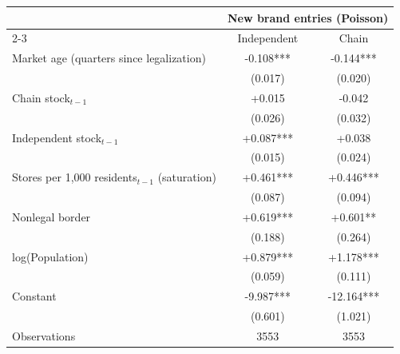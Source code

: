 \begin{tabular}{@{}lcc@{}}
\toprule
 & \multicolumn{2}{c}{New brand entries (Poisson)} \\
\cmidrule(lr){2-3}
 & Independent & Chain \\
\midrule
Market age (quarters since legalization) & -0.108*** & -0.144*** \\
 & (0.017) & (0.020) \\
Chain stock$_{t-1}$ & +0.015 & -0.042 \\
 & (0.026) & (0.032) \\
Independent stock$_{t-1}$ & +0.087*** & +0.038 \\
 & (0.015) & (0.024) \\
Stores per 1{,}000 residents$_{t-1}$ (saturation) & +0.461*** & +0.446*** \\
 & (0.087) & (0.094) \\
Nonlegal border & +0.619*** & +0.601** \\
 & (0.188) & (0.264) \\
log(Population) & +0.879*** & +1.178*** \\
 & (0.059) & (0.111) \\
Constant & -9.987*** & -12.164*** \\
 & (0.601) & (1.021) \\
\midrule
Observations & 3553 & 3553 \\
\bottomrule
\end{tabular}
